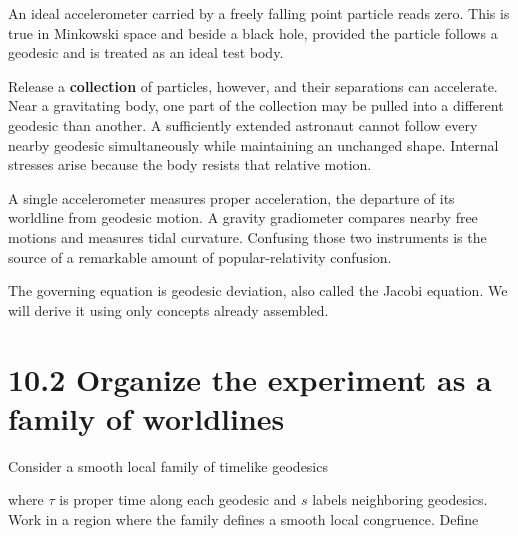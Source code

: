 \documentclass[
  11pt,
  letterpaper,
  oneside,
  openany]{scrbook}
\begin{document}
An ideal accelerometer carried by a freely falling point particle reads
zero. This is true in Minkowski space and beside a black hole, provided
the particle follows a geodesic and is treated as an ideal test body.

Release a \textbf{collection} of particles, however, and their
separations can accelerate. Near a gravitating body, one part of the
collection may be pulled into a different geodesic than another. A
sufficiently extended astronaut cannot follow every nearby geodesic
simultaneously while maintaining an unchanged shape. Internal stresses
arise because the body resists that relative motion.

A single accelerometer measures proper acceleration, the departure of
its worldline from geodesic motion. A gravity gradiometer compares
nearby free motions and measures tidal curvature. Confusing those two
instruments is the source of a remarkable amount of popular-relativity
confusion.

The governing equation is geodesic deviation, also called the Jacobi
equation. We will derive it using only concepts already assembled.

\hypertarget{organize-the-experiment-as-a-family-of-worldlines}{%
\section{10.2 Organize the experiment as a family of
worldlines}\label{organize-the-experiment-as-a-family-of-worldlines}}

Consider a smooth local family of timelike geodesics

\begin{center}
\begingroup
{}
\ifdim\wd\grmathbox>\linewidth
\resizebox{\linewidth}{!}{\usebox{\grmathbox}}
\else\usebox{\grmathbox}\fi
\endgroup
\end{center}

where \(\tau\) is proper time along each geodesic and \(s\) labels
neighboring geodesics. Work in a region where the family defines a
smooth local congruence. Define

\begin{center}
\begingroup
{}
\ifdim\wd\grmathbox>\linewidth
\resizebox{\linewidth}{!}{\usebox{\grmathbox}}
\else\usebox{\grmathbox}\fi
\endgroup
\end{center}
\end{document}
